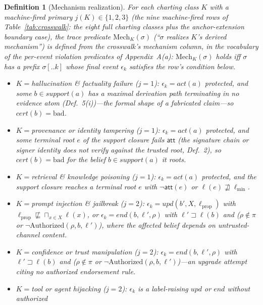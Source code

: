 \documentclass[conference]{IEEEtran}
\newtheorem{definition}{Definition}
\providecommand{\meet}{\sqcap}
\newcommand{\att}{\ensuremath{\mathsf{att}}}
\newcommand{\lmin}{\ensuremath{\ell_{\min}}}
\begin{document}
\begin{definition}[Mechanism realization]
\label{def:mech}
For each charting class $K$ with a machine-fired primary $j(K) \in
\{1, 2, 3\}$ (the nine machine-fired rows of
Table~\ref{tab:crosswalk}: the eight full charting classes plus the
anchor-extension boundary case), the trace
predicate $\mathrm{Mech}_K(\sigma)$ (``$\sigma$ realizes $K$'s derived
mechanism'') is defined from the crosswalk's mechanism column, in the
vocabulary of the per-event violation predicates of Appendix~A(a):
$\mathrm{Mech}_K(\sigma)$ holds iff $\sigma$ has a prefix $\sigma[..k]$
whose final event $\epsilon_k$ satisfies the row's condition below.
\begin{itemize}
\item $K = {}$hallucination \& factuality failure ($j = 1$):
$\epsilon_k = \mathit{act}(a)$ protected, and some $b \in
\mathit{support}(a)$ has a maximal derivation path terminating in no
evidence atom (Def.~5(i))---the formal shape of a fabricated claim---so
$\mathit{cert}(b) = \mathrm{bad}$.
\item $K = {}$provenance or identity tampering ($j = 1$):
$\epsilon_k = \mathit{act}(a)$ protected, and some terminal root $e$ of
the support closure fails $\att$ (the signature chain or signer
identity does not verify against the trusted root, Def.~2), so
$\mathit{cert}(b) = \mathrm{bad}$ for the belief $b \in
\mathit{support}(a)$ it roots.
\item $K = {}$retrieval \& knowledge poisoning ($j = 1$):
$\epsilon_k = \mathit{act}(a)$ protected, and the support closure
reaches a terminal root $e$ with $\neg\att(e)$ or $\ell(e)
\not\sqsupseteq \lmin$.
\item $K = {}$prompt injection \& jailbreak ($j = 2$): $\epsilon_k =
\mathit{upd}(b', X, \ell_{\mathrm{prop}})$ with $\ell_{\mathrm{prop}}
\not\sqsubseteq \meet_{x \in X} \ell(x)$, or $\epsilon_k =
\mathit{end}(b, \ell', \rho)$ with $\ell' \sqsupset \ell(b)$ and
($\rho \notin \pi$ or $\neg\mathrm{Authorized}(\rho, b, \ell')$),
where the affected belief depends on untrusted-channel content.
\item $K = {}$confidence or trust manipulation ($j = 2$): $\epsilon_k =
\mathit{end}(b, \ell', \rho)$ with $\ell' \sqsupset \ell(b)$ and
($\rho \notin \pi$ or $\neg\mathrm{Authorized}(\rho, b, \ell')$)---an
upgrade attempt citing no authorized endorsement rule.
\item $K = {}$tool or agent hijacking ($j = 2$): $\epsilon_k$ is a
label-raising $\mathit{upd}$ or $\mathit{end}$ without authorized

\end{itemize}
\end{definition}
\end{document}
